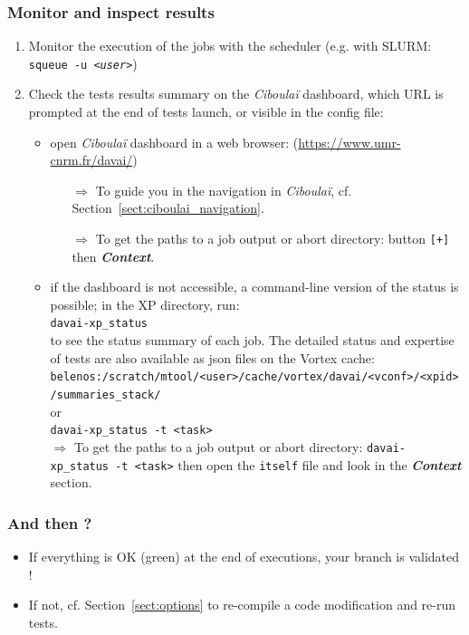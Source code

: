 \documentclass[a4paper,10pt,twoside]{article}
\begin{document}
\subsubsection{Monitor and inspect results}
\begin{enumerate}[resume,label=(\alph*)]
 \item Monitor the execution of the jobs with the scheduler (e.g. with SLURM: \texttt{squeue -u \textit{<user>}})
 \item Check the tests results summary on the \textit{Ciboulaï} dashboard, which URL is prompted at the end of tests launch, or visible in the config file:
 \begin{itemize}
  \item open \textit{Ciboulaï} dashboard in a web browser: (\href{https://www.umr-cnrm.fr/davai/}{https://www.umr-cnrm.fr/davai/})
  \begin{itemize}
   \item[$\Rightarrow$] To guide you in the navigation in \textit{Ciboulaï}, cf. Section~\ref{sect:ciboulai_navigation}.
   \item[$\Rightarrow$] To get the paths to a job output or abort directory: button \texttt{[+]} then \textit{\textbf{Context}}.
  \end{itemize}
  \item if the dashboard is not accessible, a command-line version of the status is possible; in the XP directory, run:\\
  \texttt{davai-xp\_status}\\
  to see the status summary of each job.
  The detailed status and expertise of tests are also available as json files on the Vortex cache:\\
 \texttt{belenos:/scratch/mtool/<user>/cache/vortex/davai/<vconf>/<xpid>/summaries\_stack/}\\
 or\\
 \texttt{davai-xp\_status -t <task>}\\
 $\Rightarrow$ To get the paths to a job output or abort directory: \texttt{davai-xp\_status -t <task>} then open the \texttt{itself} file and look in the \textit{\textbf{Context}} section.
 \end{itemize}
\end{enumerate}

\subsubsection*{And then ?}
\begin{itemize}
 \item If everything is OK (green) at the end of executions, your branch is validated !
 \item If not, cf. Section~\ref{sect:options} to re-compile a code modification and re-run tests.
\end{itemize}
\end{document}
